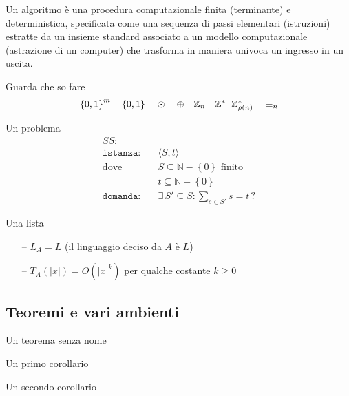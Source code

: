 \begin{definition}[Algoritmo]\label{def:algex}
    Un algoritmo è una procedura computazionale finita (terminante) e deterministica, specificata come una sequenza di passi elementari (istruzioni) estratte da un insieme standard associato a un modello computazionale (astrazione di un computer) che trasforma in maniera univoca un ingresso in un uscita.
\end{definition}

Guarda che so fare
\begin{equation*}
    \left\{0,1\right\}^{m}
    \quad
    \left\{0,1\right\}^{}
    \quad
    \odot
    \quad
    \oplus
    \quad
    \mathbb{Z}_{n}
    \quad
    \mathbb{Z}_{\quad}^{*}
    \mathbb{Z}_{\rho(n)}^{*}
    \quad
    \equiv_n
\end{equation*}

Un problema
\begin{align*}
    SS: & \\
    \texttt{istanza:} \quad &
    \langle
        S,t
    \rangle
    \\
    \text{dove} \quad &
    S \subseteq \mathbb{N} - \left\{ 0 \right\} \text{ finito}
    \\
    &
    t \subseteq \mathbb{N} - \left\{ 0 \right\} \\
    \texttt{domanda:} \quad &
    \exists \, S' \subseteq S : \sum_{s \in S'}^{} s = t \, ?
\end{align*}

Una lista
\begin{itemize}[noitemsep,parsep=0pt,partopsep=0pt,topsep=0pt]
    \item[--] $L_A = L$ (il linguaggio deciso da $A$ è $L$)
    \item[--] $T_A(|x|) = O(|x|^k)$ per qualche costante $k \geq 0$
\end{itemize}

\subsection{Teoremi e vari ambienti }

\begin{theorem}
    Un teorema senza nome
\end{theorem}

\begin{corollario}
    Un primo corollario
\end{corollario}

\begin{corollario}
    Un secondo corollario
\end{corollario}

